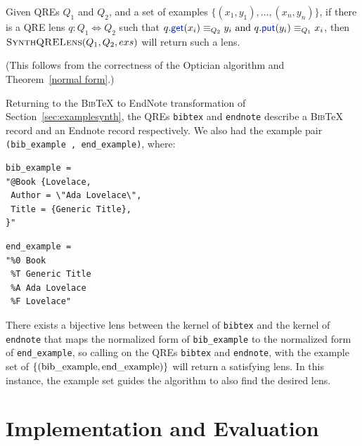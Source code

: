 \documentclass[acmsmall,screen]{acmart}
\newcommand{\kw}[1]{\textcolor{dkblue}{\ensuremath{\mathsf{#1}}}}
\newcommand{\bibtex}{\textsc{Bib}\TeX{}}
\newcommand{\get}{\ensuremath{\kw{get}}}
\newcommand{\lput}{\ensuremath{\kw{put}}}
\newcommand{\cd}[1]{\lstinline[backgroundcolor=\color{white}]$#1$}
\begin{document}
\noindent
\begin{theorem}\label{thm:alg-correct}
  Given QREs $Q_1$ and $Q_2$, and a set of examples
  $\{(x_1,y_1),\ldots,(x_n,y_n)\}$, if there is a QRE lens $q : Q_1
  \Leftrightarrow Q_2$ such that $q.\get(x_i) \equiv_{Q_2} y_i \text{ and }
q.\lput(y_i) \equiv_{Q_1} x_i$, then $\textproc{SynthQRELens}(Q_1,Q_2,exs)$ will
return such a lens.
\end{theorem}

\noindent
(This follows from the correctness of the Optician algorithm and
Theorem~\ref{normal form}.)

Returning to the \bibtex{} to EndNote transformation of
Section~\ref{sec:examplesynth}, the QREs \cd{bibtex} and \cd{endnote}
describe a \bibtex{} record and an Endnote record respectively. We also had
the example pair \cd{(bib_example , end_example)}, where:
\begin{center}
\begin{minipage}{2.5in}
\begin{lstlisting}
bib_example =
"@Book {Lovelace,
 Author = \"Ada Lovelace\",
 Title = {Generic Title},
}"
\end{lstlisting}
\end{minipage}
\begin{minipage}{1.5in}
\begin{lstlisting}
end_example =
"%0 Book
 %T Generic Title
 %A Ada Lovelace
 %F Lovelace"
\end{lstlisting}
\end{minipage}
\end{center}
There exists a bijective lens between the kernel of \cd{bibtex} and the kernel
of \cd{endnote} that maps the normalized form of \cd{bib_example} to the
normalized form of \cd{end_example}, so calling  on the
QREs \cd{bibtex} and \cd{endnote}, with the example set of
$\{(\text{\cd{bib\_example}},\text{\cd{end\_example}})\}$ will return a
satisfying lens. In this instance, the example set guides the algorithm to also
find the desired lens.

\section{Implementation and Evaluation}
\label{impl}
\end{document}
